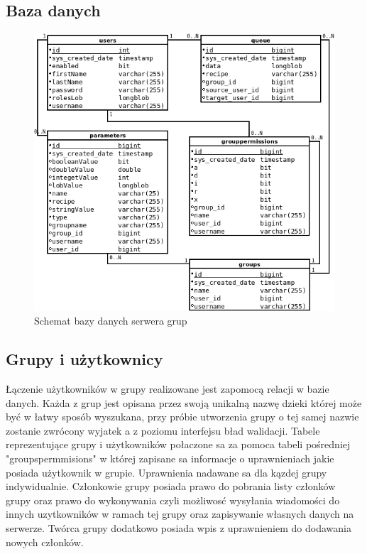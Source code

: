 \documentclass[11pt,a4paper,polish,thesis]{dcsbook}
\begin{document}
\subsection{Baza danych}
\begin{figure}[H]
  \centering
  \includegraphics[scale=0.7]{./resources/server_db.png}
  \caption{Schemat bazy danych serwera grup}
  \label{fig:server_db}
\end{figure}
\subsection{Grupy i użytkownicy}


Łączenie użytkowników w grupy realizowane jest zapomocą relacji w bazie danych. 
Każda z grup jest opisana przez swoją unikalną nazwę dzieki której może być w łatwy sposób wyszukana, przy próbie utworzenia grupy o tej samej nazwie zostanie zwrócony wyjatek a z poziomu interfejsu bład walidacji.
Tabele reprezentujące grupy i użytkowników połaczone sa za pomoca tabeli pośredniej "groupspermmisions" w której zapisane sa informacje o uprawnieniach jakie posiada użytkownik w grupie. 
Uprawnienia nadawane sa dla kązdej grupy indywidualnie. 
Członkowie grupy posiada prawo do pobrania listy członków grupy oraz prawo do wykonywania czyli możliwosć wysyłania wiadomości do innych uzytkowników w ramach tej grupy oraz zapisywanie własnych danych na serwerze.
Twórca grupy dodatkowo posiada wpis z uprawnieniem do dodawania nowych członków. 
\end{document}
